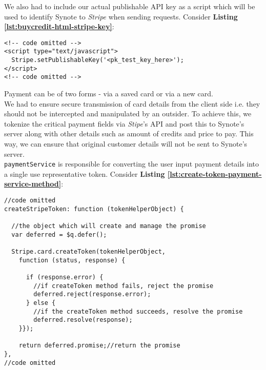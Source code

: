 We also had to include our actual publishable API key as a script which will be used to identify Synote to \textit{Stripe} when sending requests. Consider \textbf{Listing \ref{lst:buycredit-html-stripe-key}}:\\

\begin{listing}[H]
\begin{verbatim}
<!-- code omitted -->
<script type="text/javascript">
  Stripe.setPublishableKey('<pk_test_key_here>');
</script>
<!-- code omitted -->
\end{verbatim}
\label{lst:buycredit-html-stripe-key}
\end{listing}

Payment can be of two forms - via a saved card or via a new card.\\

We had to ensure secure transmission of card details from the client side i.e. they should not be intercepted and manipulated by an outsider. To achieve this, we tokenize the critical payment fields via \textit{Stipe}’s API and post this to Synote’s server along with other details such as amount of credits and price to pay. This way, we can ensure that original customer details will not be sent to Synote's server.\\

\texttt{paymentService} is responsible for converting the user input payment details into a single use representative token.  Consider \textbf{Listing \ref{lst:create-token-payment-service-method}}:\\

\begin{listing}[H]
\begin{verbatim}
//code omitted
createStripeToken: function (tokenHelperObject) {

  //the object which will create and manage the promise
  var deferred = $q.defer();

  Stripe.card.createToken(tokenHelperObject,
    function (status, response) {

      if (response.error) {
        //if createToken method fails, reject the promise
        deferred.reject(response.error);
      } else {
        //if the createToken method succeeds, resolve the promise
        deferred.resolve(response);
    }});

    return deferred.promise;//return the promise
},
//code omitted
\end{verbatim}
\label{lst:create-token-payment-service-method}
\end{listing}

